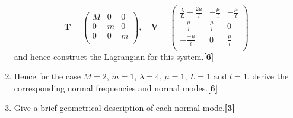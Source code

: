 \documentclass[a4paper]{article}
\begin{document}
\begin{qns}
\begin{enumerate}[label=(\roman*)]
$$\mathbf{T}=\begin{pmatrix}M&0&0\\0&m&0\\0&0&m\\\end{pmatrix}, \quad\mathbf{V}=\begin{pmatrix}\frac{\lambda}{L}+\frac{2\mu}{l}&-\frac{\mu}{l}&-\frac{\mu}{l}\\-\frac{\mu}{l}&\frac{\mu}{l}&0\\-\frac{-\mu}{l}&0&\frac{\mu}{l}\\\end{pmatrix}$$
and hence construct the Lagrangian for this system.\hfill\textbf{[6]}
\item Hence for the case $M = 2$, $m = 1$, $\lambda= 4$, $\mu=1$, $L = 1$ and $l = 1$, derive the corresponding normal frequencies and normal modes.\hfill\textbf{[6]}
\item Give a brief geometrical description of each normal mode.\hfill\textbf{[3]}
\end{enumerate}
\end{qns}
\newpage
\end{document}
